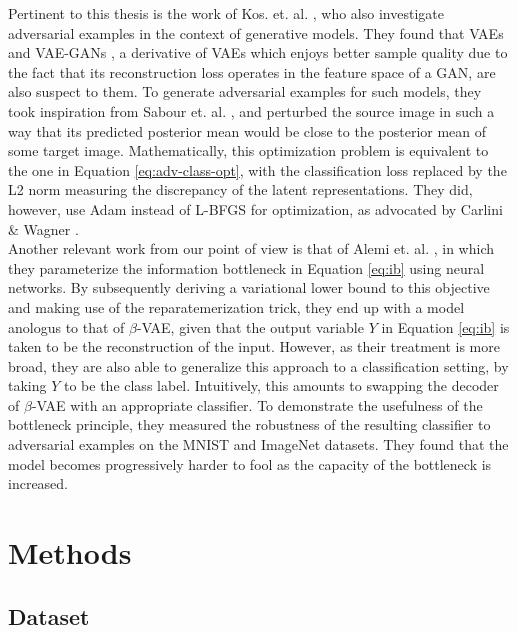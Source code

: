 \documentclass{report}
\begin{document}
\noindent Pertinent to this thesis is the work of Kos. et. al. \cite{kos-gen-adv}, who also investigate adversarial examples in the context of generative models. They found that VAEs and VAE-GANs \cite{vaegan}, a derivative of VAEs which enjoys better sample quality due to the fact that its reconstruction loss operates in the feature space of a GAN, are also suspect to them. To generate adversarial examples for such models, they took inspiration from Sabour et. al. \cite{sabour}, and perturbed the source image in such a way that its predicted posterior mean would be close to the posterior mean of some target image. Mathematically, this optimization problem is equivalent to the one in Equation \ref{eq:adv-class-opt}, with the classification loss replaced by the L2 norm measuring the discrepancy of the latent representations. They did, however, use Adam instead of L-BFGS for optimization, as advocated by Carlini \& Wagner \cite{carlini-wagner-16}. \\

\noindent Another relevant work from our point of view is that of Alemi et. al. \cite{deep-variational-bottleneck}, in which they parameterize the information bottleneck in Equation \ref{eq:ib} using neural networks. By subsequently deriving a variational lower bound to this objective and making use of the reparatemerization trick, they end up with a model anologus to that of $\beta$-VAE, given that the output variable $Y$ in Equation \ref{eq:ib} is taken to be the reconstruction of the input. However, as their treatment is more broad, they are also able to generalize this approach to a classification setting, by taking $Y$ to be the class label. Intuitively, this amounts to swapping the decoder of $\beta$-VAE with an appropriate classifier. To demonstrate the usefulness of the bottleneck principle, they measured the robustness of the resulting classifier to adversarial examples on the MNIST and ImageNet datasets. They found that the model becomes progressively harder to fool as the capacity of the bottleneck is increased.

\chapter{Methods}

\section{Dataset}
\end{document}
